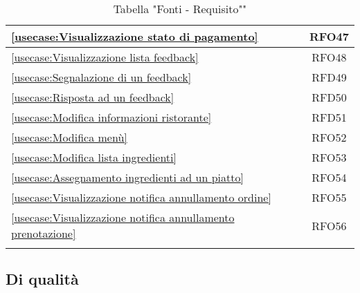 \begin{longtable}{|l|c|}
	\hline
	\autoref{usecase:Visualizzazione stato di pagamento}                                                                                                         & RFO47                  \\
	\hline
	\autoref{usecase:Visualizzazione lista feedback}                                                                                                             & RFO48                  \\
	\hline
	\autoref{usecase:Segnalazione di un feedback}                                                                                                                & RFD49                  \\
	\hline
	\autoref{usecase:Risposta ad un feedback}                                                                                                                    & RFD50                  \\
	\hline
	\autoref{usecase:Modifica informazioni ristorante}                                                                                                           & RFD51                  \\
	\hline
	\autoref{usecase:Modifica menù}                                                                                                                              & RFO52                  \\
	\hline
	\autoref{usecase:Modifica lista ingredienti}                                                                                                                 & RFO53                  \\
	\hline
	\autoref{usecase:Assegnamento ingredienti ad un piatto}                                                                                                      & RFO54                  \\
	\hline
	\autoref{usecase:Visualizzazione notifica annullamento ordine}                                                                                               & RFO55                  \\
	\hline
	\autoref{usecase:Visualizzazione notifica annullamento prenotazione}                                                                                         & RFO56                  \\
	\hline
	\caption{Tabella "Fonti - Requisito""}
\end{longtable}




\subsection{Di qualità}

